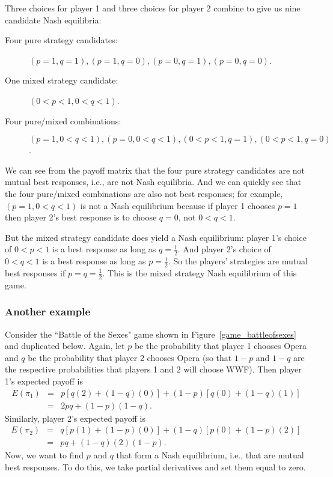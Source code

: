 Three choices for player 1 and three choices for player 2 combine to give us nine candidate Nash equilibria:
\begin{description}
\item[Four pure strategy candidates:] $(p=1, q=1), (p=1, q=0), (p=0, q=1), (p=0, q=0)$.

\item[One mixed strategy candidate:] $(0<p<1, 0<q<1)$.

\item[Four pure/mixed combinations:] $(p=1, 0<q<1), (p=0, 0<q<1), (0<p<1, q=1), (0<p<1, q=0)$.
\end{description}
%
We can see from the payoff matrix that the four pure strategy candidates are not mutual best responses, i.e., are not Nash equilibria. And we can quickly see that the four pure/mixed combinations are also not best responses; for example, $(p=1, 0<q<1)$ is not a Nash equilibrium because if player 1 chooses $p=1$ then player 2's best response is to choose $q=0$, not $0<q<1$.

But the mixed strategy candidate does yield a Nash equilibrium: player 1's choice of $0<p<1$ is a best response as long as $q=\frac{1}{2}$. And player 2's choice of $0<q<1$ is a best response as long as $p=\frac{1}{2}$. So the players' strategies are mutual best responses if $p=q=\frac{1}{2}$. This is the mixed strategy Nash equilibrium of this game.

\subsubsection*{Another example}

Consider the ``Battle of the Sexes" game shown in Figure~\ref{game_battleofsexes} and duplicated below. Again, let $p$ be the probability that player 1 chooses Opera and $q$ be the probability that player 2 chooses Opera (so that $1-p$ and $1-q$ are the respective probabilities that players 1 and 2 will choose WWF). Then player 1's expected payoff is
\begin{eqnarray*}
E(\pi_1) & = & p[q(2)+(1-q)(0)]+(1-p)[q(0)+(1-q)(1)] \\
& = & 2pq+(1-p)(1-q).
\end{eqnarray*}
%
Similarly, player 2's expected payoff is
\begin{eqnarray*}
E(\pi_2) & = & q[p(1)+(1-p)(0)]+(1-q)[p(0)+(1-p)(2)]\\
& = & pq+(1-q)(2)(1-p).
\end{eqnarray*}
%
Now, we want to find $p$ and $q$ that form a Nash equilibrium, i.e., that are mutual best responses. To do this, we take partial derivatives and set them equal to zero.

